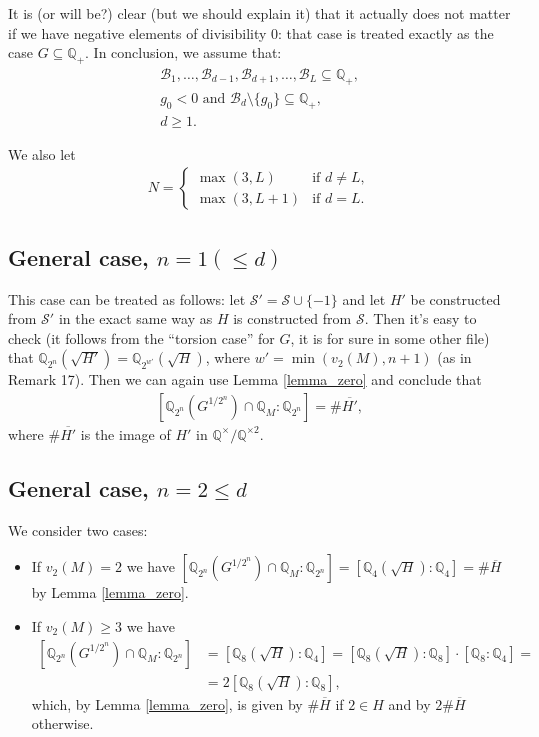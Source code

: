 \documentclass[10pt,a4paper]{article}
\theoremstyle{definition}
\begin{document}
It is (or will be?) clear ({\color{red}but we should explain it}) that it actually does not matter if we have negative elements of divisibility $0$: that case is treated exactly as the case $G\subseteq \mathbb{Q}_+$. In conclusion, we assume that:
\begin{align*}
\mathcal{B}_1,\dots,\mathcal{B}_{d-1},\mathcal{B}_{d+1},\dots,\mathcal{B}_L\subseteq \mathbb{Q}_+,\\
g_0<0 \text{ and }\mathcal{B}_d\setminus \{g_0\}\subseteq \mathbb{Q}_+,\\
d\geq 1.
\end{align*}

We also let
\begin{align*}
N=\begin{cases}
\max(3,L)&\text{if }d\neq L,\\
\max(3,L+1)&\text{if }d=L.
\end{cases}
\end{align*}

\subsection{General case, $n=1(\leq d)$}
This case can be treated as follows: let $\mathcal{S}'=\mathcal{S}\cup \{-1\}$ and let $H'$ be constructed from $\mathcal{S}'$ in the exact same way as $H$ is constructed from $\mathcal{S}$. Then it's easy to check ({\color{red}it follows from the ``torsion case'' for $G$, it is for sure in some other file}) that $\mathbb{Q}_{2^n}\left(\sqrt{H'}\right)=\mathbb{Q}_{2^{w'}}\left(\sqrt{H}\right)$, where $w'=\min(v_2(M),n+1)$ (as in Remark 17). Then we can again use Lemma \ref{lemma_zero} and conclude that
\begin{align*}
\left[\mathbb{Q}_{2^n}\left(G^{1/2^n}\right)\cap \mathbb{Q}_M:\mathbb{Q}_{2^n}\right]=
\#\overline{H'},
\end{align*}
where $\#\overline{H'}$ is the image of $H'$ in $\mathbb{Q}^\times/\mathbb{Q}^{\times 2}$.

\subsection{General case, $n=2\leq d$}
We consider two cases:
\begin{itemize}
\item If $v_2(M)=2$ we have $\left[\mathbb{Q}_{2^n}\left(G^{1/2^n}\right)\cap \mathbb{Q}_M:\mathbb{Q}_{2^n}\right]=\left[\mathbb{Q}_4\left(\sqrt{H}\right):\mathbb{Q}_4\right]=\#\overline{H}$ by Lemma \ref{lemma_zero}.
\item If $v_2(M)\geq 3$ we have
\begin{align*}
\left[\mathbb{Q}_{2^n}\left(G^{1/2^n}\right)\cap \mathbb{Q}_M:\mathbb{Q}_{2^n}\right]&=\left[\mathbb{Q}_8\left(\sqrt{H}\right):\mathbb{Q}_4\right]=\left[\mathbb{Q}_8\left(\sqrt{H}\right):\mathbb{Q}_8\right]\cdot \left[\mathbb{Q}_8:\mathbb{Q}_4\right]=\\&=2\left[\mathbb{Q}_8\left(\sqrt{H}\right):\mathbb{Q}_8\right],
\end{align*}
which, by Lemma \ref{lemma_zero}, is given by $\#\overline{H}$ if $2 \in H$ and by $2\#\overline{H}$ otherwise.
\end{itemize}
\end{document}
